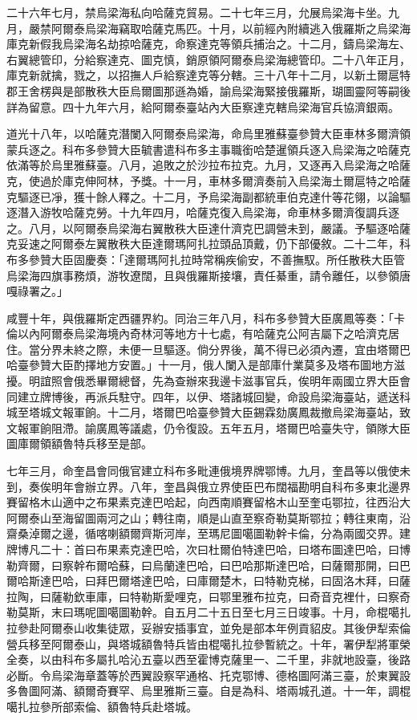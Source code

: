 \begin{pinyinscope}
二十六年七月，禁烏梁海私向哈薩克貿易。二十七年三月，允展烏梁海卡坐。九月，嚴禁阿爾泰烏梁海竊取哈薩克馬匹。十月，以前經內附續逃入俄羅斯之烏梁海庫克新假我烏梁海名劫掠哈薩克，命察達克等領兵捕治之。十二月，鑄烏梁海左、右翼總管印，分給察達克、圖克慎，銷原領阿爾泰烏梁海總管印。二十八年正月，庫克新就擒，戮之，以招撫人戶給察達克等分轄。三十八年十二月，以新土爾扈特郡王舍楞與是部散秩大臣烏爾圖那遜為婚，諭烏梁海緊接俄羅斯，瑚圖靈阿等嗣後詳為留意。四十九年六月，給阿爾泰臺站內大臣察達克轄烏梁海官兵協濟銀兩。

道光十八年，以哈薩克潛闌入阿爾泰烏梁海，命烏里雅蘇臺參贊大臣車林多爾濟領蒙兵逐之。科布多參贊大臣毓書遣科布多主事職銜哈楚暹領兵逐入烏梁海之哈薩克依滿等於烏里雅蘇臺。八月，追敗之於沙拉布拉克。九月，又逐再入烏梁海之哈薩克，使過於庫克伸阿林，予獎。十一月，車林多爾濟奏前入烏梁海土爾扈特之哈薩克驅逐已凈，獲十餘人釋之。十二月，予烏梁海副都統車伯克達什等花翎，以論驅逐潛入游牧哈薩克勞。十九年四月，哈薩克復入烏梁海，命車林多爾濟復調兵逐之。八月，以阿爾泰烏梁海右翼散秩大臣達什濟克巴調營未到，嚴議。予驅逐哈薩克妥速之阿爾泰左翼散秩大臣達爾瑪阿扎拉頭品頂戴，仍下部優敘。二十二年，科布多參贊大臣固慶奏：「達爾瑪阿扎拉時常稱疾偷安，不善撫馭。所任散秩大臣管烏梁海四旗事務煩，游牧遼闊，且與俄羅斯接壤，責任綦重，請令離任，以參領唐嘎祿署之。」

咸豐十年，與俄羅斯定西疆界約。同治三年八月，科布多參贊大臣廣鳳等奏：「卡倫以內阿爾泰烏梁海境內奇林河等地方十七處，有哈薩克公阿吉屬下之哈濟克居住。當分界未終之際，未便一旦驅逐。倘分界後，萬不得已必須內遷，宜由塔爾巴哈臺參贊大臣酌擇地方安置。」十一月，俄人闌入是部庫什業莫多及塔布圖地方滋擾。明誼照會俄悉畢爾總督，先為查辦來我邊卡滋事官兵，俟明年兩國立界大臣會同建立牌博後，再派兵駐守。四年，以伊、塔諸城回變，命設烏梁海臺站，遞送科城至塔城文報軍餉。十二月，塔爾巴哈臺參贊大臣錫霖劾廣鳳裁撤烏梁海臺站，致文報軍餉阻滯。諭廣鳳等議處，仍令復設。五年五月，塔爾巴哈臺失守，領隊大臣圖庫爾領額魯特兵移至是部。

七年三月，命奎昌會同俄官建立科布多毗連俄境界牌鄂博。九月，奎昌等以俄使未到，奏俟明年會辦立界。八年，奎昌與俄立界使臣巴布闊福勘明自科布多東北邊界賽留格木山適中之布果素克達巴哈起，向西南順賽留格木山至奎屯鄂拉，往西沿大阿爾泰山至海留圖兩河之山；轉往南，順是山直至察奇勒莫斯鄂拉；轉往東南，沿齋桑淖爾之邊，循喀喇額爾齊斯河岸，至瑪尼圖噶圖勒幹卡倫，分為兩國交界。建牌博凡二十：首曰布果素克達巴哈，次曰杜爾伯特達巴哈，曰塔布圖達巴哈，曰博勒齊爾，曰察幹布爾哈蘇，曰烏蘭達巴哈，曰巴哈那斯達巴哈，曰薩爾那開，曰巴爾哈斯達巴哈，曰拜巴爾塔達巴哈，曰庫爾楚木，曰特勒克梯，曰固洛木拜，曰薩拉陶，曰薩勒欽車庫，曰特勒斯愛哩克，曰鄂里雅布拉克，曰奇音克裡什，曰察奇勒莫斯，末曰瑪呢圖噶圖勒幹。自五月二十五日至七月三日竣事。十月，命棍噶扎拉參赴阿爾泰山收集徒眾，妥辦安插事宜，並免是部本年例貢貂皮。其後伊犁索倫營兵移至阿爾泰山，與塔城額魯特兵皆由棍噶扎拉參暫統之。十年，署伊犁將軍榮全奏，以由科布多屬扎哈沁五臺以西至霍博克薩里一、二千里，非就地設臺，後路必斷。令烏梁海章蓋等於西翼設察罕通格、托克鄂博、德格圖阿滿三臺，於東翼設多魯圖阿滿、額爾奇賽罕、烏里雅斯三臺。自是為科、塔兩城孔道。十一年，調棍噶扎拉參所部索倫、額魯特兵赴塔城。


\end{pinyinscope}
